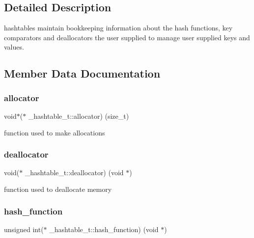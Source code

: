 \subsection{Detailed Description}
hashtables maintain bookkeeping information about the hash functions, key comparators and deallocators the user supplied to manage user supplied keys and values. 

\subsection{Member Data Documentation}
\hypertarget{struct__hashtable__t_ac6760550899baf2bf96ab0c72bb49029}{}\label{struct__hashtable__t_ac6760550899baf2bf96ab0c72bb49029} 
\subsubsection{\texorpdfstring{allocator}{allocator}}
{\footnotesize\ttfamily void$\ast$($\ast$ \+\_\+hashtable\+\_\+t\+::allocator) (size\+\_\+t)}



function used to make allocations 

\hypertarget{struct__hashtable__t_ab4b20ea8ea22a5c4ba1b8302cc1dfbf1}{}\label{struct__hashtable__t_ab4b20ea8ea22a5c4ba1b8302cc1dfbf1} 
\subsubsection{\texorpdfstring{deallocator}{deallocator}}
{\footnotesize\ttfamily void($\ast$ \+\_\+hashtable\+\_\+t\+::deallocator) (void $\ast$)}



function used to deallocate memory 

\hypertarget{struct__hashtable__t_aa837007e529fa6837bca0cab2d31340a}{}\label{struct__hashtable__t_aa837007e529fa6837bca0cab2d31340a} 
\subsubsection{\texorpdfstring{hash\+\_\+function}{hash\_function}}
{\footnotesize\ttfamily unsigned int($\ast$ \+\_\+hashtable\+\_\+t\+::hash\+\_\+function) (void $\ast$)}




